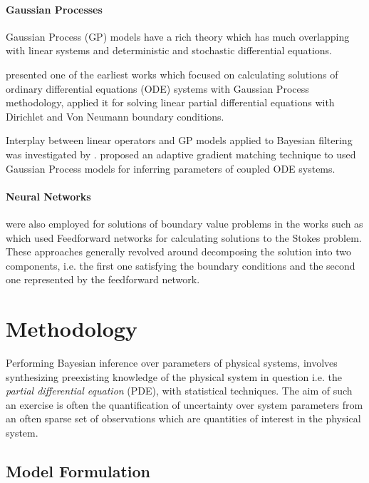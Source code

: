 \paragraph{Gaussian Processes}

Gaussian Process (GP) models \citep{Rasmussen:2005:GPM:1162254} have a rich theory which has much overlapping 
with linear systems and deterministic and stochastic differential equations. 

\citet{Skilling1992} presented one of the earliest works which focused on calculating solutions of ordinary 
differential equations (ODE) systems with Gaussian Process methodology, \citet{Graepel} applied it for solving 
linear partial differential equations with Dirichlet and Von Neumann boundary conditions.

Interplay between linear operators and GP models applied to Bayesian filtering was investigated by \citet{Sarkka2011}. 
\citet{pmlr-v31-dondelinger13a} proposed an adaptive gradient matching technique to used Gaussian Process models for 
inferring parameters of coupled ODE systems.

\paragraph{Neural Networks} were also employed for solutions of boundary value problems in the works such as 
\citet{Lagaris,Aarts2001,TSOULOS20092385,Baymani2011} which used Feedforward networks for 
calculating solutions to the Stokes problem. These approaches generally revolved around decomposing the solution 
into two components, i.e. the first one satisfying the boundary conditions and the second one represented by the 
feedforward network.


\section{Methodology}

Performing Bayesian inference over parameters of physical systems,
involves synthesizing preexisting knowledge of the physical system in
question i.e. the \emph{partial differential equation} (PDE), with
statistical techniques. The aim of such an exercise is often the
quantification of uncertainty over system parameters from an often
sparse set of observations which are quantities of interest in the
physical system. 


\subsection{Model Formulation}


